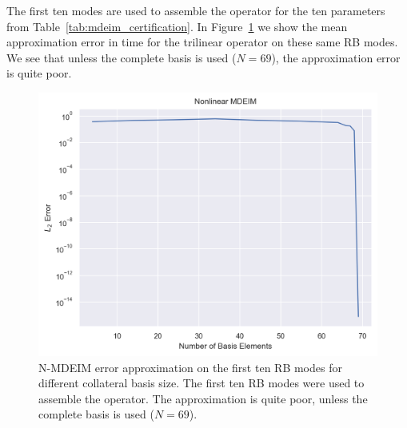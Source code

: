 \documentclass[../../thesis.tex]{subfiles}
\begin{document}
The first ten modes are used to assemble the operator for the ten parameters
from Table~\ref{tab:mdeim_certification}.
In Figure~\ref{fig:mdeim_error_approximation} we show the mean approximation error
in time for the trilinear operator on these same RB modes. 
We see that unless the complete basis is used ($N=69$),
the approximation error is quite poor.
\begin{figure}[h]
    \centering
    \includegraphics[width=1\columnwidth]{research_project/piston/figures/mdeim_certification/nonlinear_error_decay.png}
    \caption{N-MDEIM error approximation on the first ten RB modes 
    for different collateral basis size.
    The first ten RB modes were used to assemble the operator.
    The approximation is quite poor, unless the complete basis is used 
    ($N=69$).}
    \label{fig:mdeim_error_approximation}
\end{figure}
\end{document}
